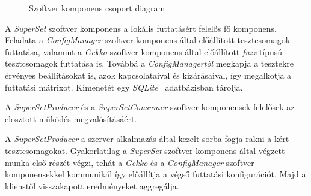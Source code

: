     \begin{figure}[ht]
        \centering
        \caption{\label{fig:component-sets} Szoftver komponens csoport diagram}
    \end{figure}

    A \textit{SuperSet} szoftver komponens a lokális futtatásért felelős fő komponens. Feladata a
    \textit{ConfigManager} szoftver komponens által előállított tesztcsomagok futtatása, valamint a \textit{Gekko}
    szoftver komponens által előállított \textit{fuzz} típusú tesztcsomagok futtatása is. Továbbá a
    \textit{ConfigManagertől} megkapja a tesztekre érvényes beállításokat is, azok kapcsolataival és kizárásaival, így
    megalkotja a futtatási mátrixot. Kimenetét egy \textit{SQLite}~\cite{sqlite} adatbázisban tárolja.

    A \textit{SuperSetProducer} és a \textit{SuperSetConsumer} szoftver komponensek felelősek az elosztott működés
    megvalósításáért.

    A \textit{SuperSetProducer} a szerver alkalmazás által kezelt sorba fogja rakni a kért tesztcsomagokat.
    Gyakorlatilag a \textit{SuperSet} szoftver komponens által végzett munka első részét végzi, tehát a \textit{Gekko}
    és a \textit{ConfigManager} szoftver komponensekkel kommunikál így előállítja a végső futtatási konfigurációt. Majd
    a klienstől visszakapott eredményeket aggregálja.

